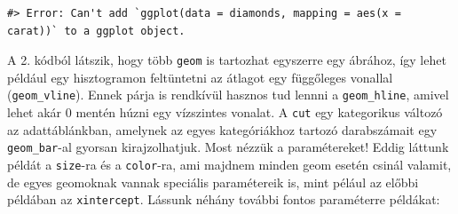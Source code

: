 \documentclass[
]{article}
\newenvironment{Shaded}{\begin{snugshade}}{\end{snugshade}}
\newcommand{\AttributeTok}[1]{\textcolor[rgb]{0.77,0.63,0.00}{#1}}
\newcommand{\FunctionTok}[1]{\textcolor[rgb]{0.00,0.00,0.00}{#1}}
\newcommand{\NormalTok}[1]{#1}
\newcommand{\SpecialCharTok}[1]{\textcolor[rgb]{0.00,0.00,0.00}{#1}}
\newcommand{\StringTok}[1]{\textcolor[rgb]{0.31,0.60,0.02}{#1}}
\begin{document}
\begin{Shaded}
\end{Shaded}

\begin{verbatim}
#> Error: Can't add `ggplot(data = diamonds, mapping = aes(x = carat))` to a ggplot object.
\end{verbatim}

A 2. kódból látszik, hogy több \texttt{geom} is tartozhat egyszerre egy ábrához, így lehet például egy hisztogramon feltüntetni az átlagot egy függőleges vonallal (\texttt{geom\_vline}). Ennek párja is rendkívül hasznos tud lennni a \texttt{geom\_hline}, amivel lehet akár 0 mentén húzni egy vízszintes vonalat. A \texttt{cut} egy kategorikus változó az adattáblánkban, amelynek az egyes kategóriákhoz tartozó darabszámait egy \texttt{geom\_bar}-al gyorsan kirajzolhatjuk. Most nézzük a paramétereket! Eddig láttunk példát a \texttt{size}-ra és a \texttt{color}-ra, ami majdnem minden geom esetén csinál valamit, de egyes geomoknak vannak speciális paramétereik is, mint pélául az előbbi példában az \texttt{xintercept}. Lássunk néhány további fontos paraméterre példákat:
\end{document}
